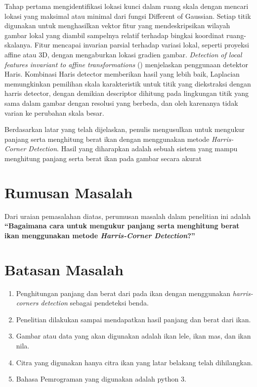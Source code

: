 Tahap pertama mengidentifikasi lokasi kunci dalam ruang skala dengan mencari lokasi yang maksimal atau minimal dari fungsi Different of Gaussian. 
Setiap titik digunakan untuk menghasilkan vektor fitur yang mendeskripsikan wilayah gambar lokal yang diambil sampelnya relatif terhadap bingkai koordinat ruang-skalanya. Fitur mencapai invarian parsial terhadap variasi lokal, 
seperti proyeksi affine atau 3D, dengan mengaburkan lokasi gradien gambar. \emph{Detection of local features invariant to affine transformations} (\cite{Mikolajczyk2004}) menjelaskan penggunaan detektor Haris. 
Kombinasi Haris detector memberikan hasil yang lebih baik, Laplacian memungkinkan pemilihan skala karakteristik untuk titik yang diekstraksi dengan harris detector, dengan demikian descriptor dihitung pada lingkungan titik yang sama dalam gambar dengan resolusi yang berbeda, 
dan oleh karenanya tidak varian ke perubahan skala besar.
 
Berdasarkan latar yang telah dijelaskan, penulis mengusulkan untuk mengukur panjang serta menghitung berat ikan dengan menggunakan metode \emph{Harris-Corner Detection}. 
Hasil yang diharapkan adalah sebuah sistem yang mampu menghitung panjang serta berat ikan pada gambar secara akurat


\section{Rumusan Masalah}
Dari uraian pemasalahan diatas, perumusan masalah dalam penelitian ini adalah \textbf{“Bagaimana cara untuk mengukur panjang serta menghitung berat ikan menggunakan metode \emph{Harris-Corner Detection}?”}

\section{Batasan Masalah}
\begin{enumerate}
	\item Penghitungan panjang dan berat dari pada ikan dengan menggunakan \emph{harris-corners detection} sebagai pendeteksi benda. 
	\item Penelitian dilakukan sampai mendapatkan hasil panjang dan berat dari ikan. 
	\item Gambar atau data yang akan digunakan adalah ikan lele, ikan mas, dan ikan nila. 
	\item Citra yang digunakan hanya citra ikan yang latar belakang telah dihilangkan. 
	\item Bahasa Pemrograman yang digunakan adalah python 3. 
\end{enumerate}
	
